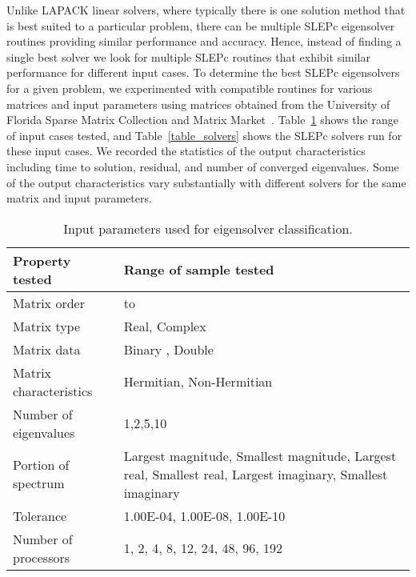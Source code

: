 \documentclass{sig-alternate}
\begin{document}
Unlike LAPACK linear solvers, where typically there is one solution method that is best suited to a particular problem, 
there can be multiple SLEPc eigensolver routines providing similar performance and accuracy. Hence, instead 
of finding a single best solver we look for multiple SLEPc routines that exhibit similar performance for different input cases.
To determine the best SLEPc eigensolvers for a given problem, we experimented with compatible routines for various
matrices and input parameters using matrices obtained from 
the University of Florida Sparse Matrix Collection and Matrix Market~\cite{matrixMarket:Online}. 
Table~\ref{table_exp} shows the range of input cases
tested, and Table~\ref{table_solvers} shows the SLEPc solvers run for these input cases.
We recorded the statistics of the output characteristics including time to solution, residual, and number of converged 
eigenvalues. Some of the output characteristics vary substantially with different solvers
for the same matrix and input parameters.
\\
\begin{table}[!htbp]
\centering
\caption{Input parameters used for eigensolver classification.}
\label{table_exp}
\begin{tabular}{|l|p{4.5cm}|}
\hline
\textbf{Property tested}                    & \textbf{Range of sample tested}                                                                                                 \\ \hline
Matrix order            &  to                                                                             \\ \hline
Matrix type           & Real, Complex
\\ \hline
Matrix data           & Binary , Double
\\ \hline
Matrix characteristics & Hermitian, Non-Hermitian
\\ \hline
Number of eigenvalues  & 1,2,5,10
\\ \hline
Portion of spectrum    & Largest magnitude, Smallest magnitude, Largest real, Smallest real, Largest imaginary, Smallest imaginary 
\\ \hline
Tolerance              &  1.00E-04, 1.00E-08, 1.00E-10
\\ \hline
Number of processors   & 1, 2, 4, 8, 12, 24, 48, 96, 192                                                                            \\ \hline
\end{tabular}
\end{table}
\end{document}
